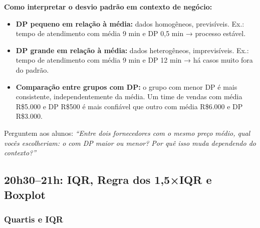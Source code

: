 \begin{SolvedBox}
\textbf{Como interpretar o desvio padrão em contexto de negócio:}
\begin{itemize}
  \item \textbf{DP pequeno em relação à média:} dados homogêneos, previsíveis.
  Ex.: tempo de atendimento com média 9 min e DP 0,5 min → processo estável.
  \item \textbf{DP grande em relação à média:} dados heterogêneos, imprevisíveis.
  Ex.: tempo de atendimento com média 9 min e DP 12 min → há casos muito fora do padrão.
  \item \textbf{Comparação entre grupos com DP:} o grupo com menor DP é mais consistente,
  independentemente da média. Um time de vendas com média R\$5.000 e DP R\$500 é mais
  confiável que outro com média R\$6.000 e DP R\$3.000.
\end{itemize}
\end{SolvedBox}

Perguntem aos alunos: \textit{``Entre dois fornecedores com o mesmo preço médio,
qual vocês escolheriam: o com DP maior ou menor? Por quê isso muda dependendo
do contexto?''}

\subsection{20h30–21h: IQR, Regra dos 1,5×IQR e Boxplot}

\subsubsection*{Quartis e IQR}

